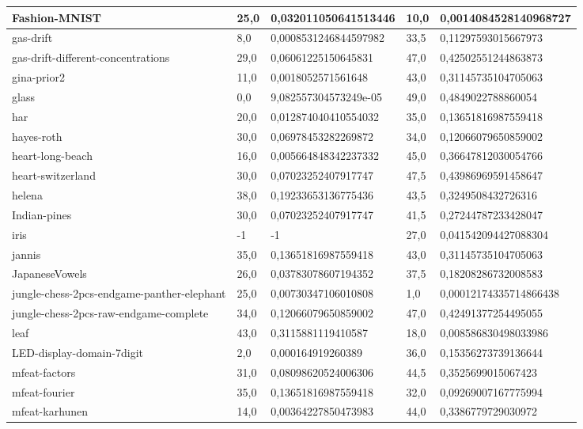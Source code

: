 \documentclass[times,specification,annotation]{itmo-student-thesis}
\begin{document}
\begin{center}
\begin{longtable}{ |m{3.4cm}|m{1.5cm}|m{4.7cm}|m{1.5cm}|m{4.7cm}| }
		\hline
		Fashion-MNIST & 25,0 & 0,032011050641513446 & 10,0 & 0,0014084528140968727 \\
		\hline
		gas-drift & 8,0 & 0,0008531246844597982 & 33,5 & 0,11297593015667973 \\
		\hline
		gas-drift-different-concentrations & 29,0 & 0,06061225150645831 & 47,0 & 0,42502551244863873 \\
		\hline
		gina-prior2 & 11,0 & 0,0018052571561648 & 43,0 & 0,31145735104705063 \\
		\hline
		glass & 0,0 & 9,082557304573249e-05 & 49,0 & 0,4849022788860054 \\
		\hline
		har & 20,0 & 0,012874040410554032 & 35,0 & 0,13651816987559418 \\
		\hline
		hayes-roth & 30,0 & 0,06978453282269872 & 34,0 & 0,12066079650859002 \\
		\hline
		heart-long-beach & 16,0 & 0,005664848342237332 & 45,0 & 0,36647812030054766 \\
		\hline
		heart-switzerland & 30,0 & 0,07023252407917747 & 47,5 & 0,43986969591458647 \\
		\hline
		helena & 38,0 & 0,19233653136775436 & 43,5 & 0,3249508432726316 \\
		\hline
		Indian-pines & 30,0 & 0,07023252407917747 & 41,5 & 0,27244787233428047 \\
		\hline
		iris & -1 & -1 & 27,0 & 0,041542094427088304 \\
		\hline
		jannis & 35,0 & 0,13651816987559418 & 43,0 & 0,31145735104705063 \\
		\hline
		JapaneseVowels & 26,0 & 0,03783078607194352 & 37,5 & 0,18208286732008583 \\
		\hline
		jungle-chess-2pcs-endgame-panther-elephant & 25,0 & 0,00730347106010808 & 1,0 & 0,00012174335714866438 \\
		\hline
		jungle-chess-2pcs-raw-endgame-complete & 34,0 & 0,12066079650859002 & 47,0 & 0,42491377254495055 \\
		\hline
		leaf & 43,0 & 0,3115881119410587 & 18,0 & 0,008586830498033986 \\
		\hline
		LED-display-domain-7digit & 2,0 & 0,000164919260389 & 36,0 & 0,15356273739136644 \\
		\hline
		mfeat-factors & 31,0 & 0,08098620524006306 & 44,5 & 0,3525699015067423 \\
		\hline
		mfeat-fourier & 35,0 & 0,13651816987559418 & 32,0 & 0,09269007167775994 \\
		\hline
		mfeat-karhunen & 14,0 & 0,00364227850473983 & 44,0 & 0,3386779729030972 \\

\end{longtable}
\end{center}
\end{document}
